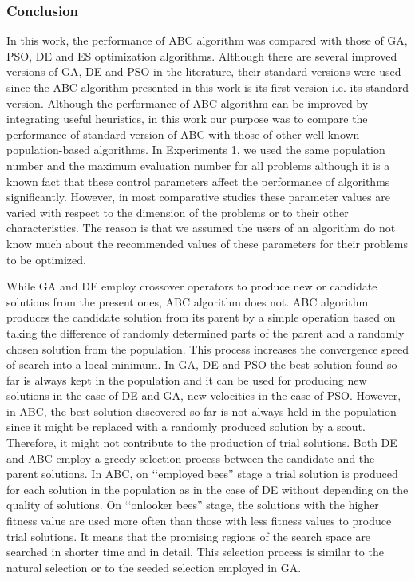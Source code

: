 \documentclass[pdftex,11pt]{article}
\begin{document}
\subsubsection{Conclusion}
In this work, the performance of ABC algorithm was compared with those of GA, PSO, DE and ES optimization algorithms. Although there are several improved versions of GA, DE and PSO in the literature, their standard versions were used since the ABC algorithm presented in this work is its first version i.e. its standard version. Although the performance of ABC algorithm can be improved by integrating useful heuristics, in this work our purpose was to compare the performance of standard version of ABC with those of other well-known population-based algorithms. In Experiments 1, we used the same population number and the maximum evaluation number for all problems although it is a known fact that these control parameters affect the performance of algorithms significantly. However, in most comparative studies these parameter values are varied with respect to the dimension of the problems or to their other characteristics. The reason is that we assumed the users of an algorithm do not know much about the recommended values of these parameters for their problems to be optimized.

While GA and DE employ crossover operators to produce new or candidate solutions from the present ones, ABC algorithm does not. ABC algorithm produces the candidate solution from its parent by a simple operation based on taking the difference of randomly determined parts of the parent and a randomly chosen solution from the population. This process increases the convergence speed of search into a local minimum. In GA, DE and PSO the best solution found so far is always kept in the population and it can be used for producing new solutions in the case of DE and GA, new velocities in the case of PSO. However, in ABC, the best solution discovered so far is not always held in the population since it might be replaced with a randomly produced solution by a scout. Therefore, it might not contribute to the production of trial solutions. Both DE and ABC employ a greedy selection process between the candidate and the parent solutions. In ABC, on ‘‘employed bees” stage a trial solution is produced for each solution in the population as in the case of DE without depending on the quality of solutions. On ‘‘onlooker bees” stage, the solutions with the higher fitness value are used more often than those with less fitness values to produce trial solutions. It means that the promising regions of the search space are searched in shorter time and in detail. This selection process is similar to the natural selection or to the seeded selection employed in GA.
\end{document}
